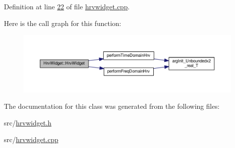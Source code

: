 Definition at line \hyperlink{hrvwidget_8cpp_source_l00022}{22} of file \hyperlink{hrvwidget_8cpp_source}{hrvwidget.\+cpp}.



Here is the call graph for this function\+:\nopagebreak
\begin{figure}[H]
\begin{center}
\leavevmode
\includegraphics[width=350pt]{classHrvWidget_adfd3a1b7a3c35e4380208cbe8d620c88_cgraph}
\end{center}
\end{figure}




The documentation for this class was generated from the following files\+:\begin{DoxyCompactItemize}
\item 
src/\hyperlink{hrvwidget_8h}{hrvwidget.\+h}\item 
src/\hyperlink{hrvwidget_8cpp}{hrvwidget.\+cpp}\end{DoxyCompactItemize}

